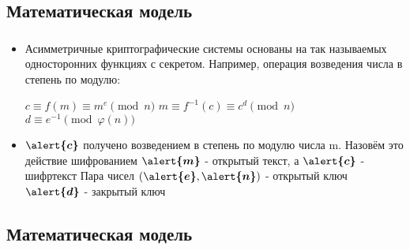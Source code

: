\documentclass[t]{beamer}
\begin{document}
\subsection{Математическая модель}

\begin{frame}[t] %
	\frametitle{\insertsection}
	\framesubtitle{\insertsubsection}
	\begin{itemize}
		\item<1-> Асимметричные криптографические системы основаны на так называемых односторонних функциях с секретом.\newline 
		Например, операция возведения числа в степень по модулю: \newline 
		\begin{center} \( c\equiv f(m) \equiv m^e \pmod{n} \) \newline
		\( m\equiv f^{-1}(c) \equiv c^d \pmod{n} \) \newline 
		\( d\equiv e^{-1} \pmod{\varphi(n)} \) \newline \end{center}
		\item<2-> $\boldsymbol{\alert{c}}$ получено возведением в степень по модулю числа m. Назовём это действие шифрованием
		\newline 
		$\boldsymbol{\alert{m}}$ - открытый текст, а $\boldsymbol{\alert{c}}$ - шифртекст
		\newline 
		Пара чисел $(\boldsymbol{\alert{e}}, \boldsymbol{\alert{n}})$ - открытый ключ
		\newline
		$\boldsymbol{\alert{d}}$ - закрытый ключ 
	\end{itemize}
\end{frame}

\subsection{Математическая модель}
\end{document}

